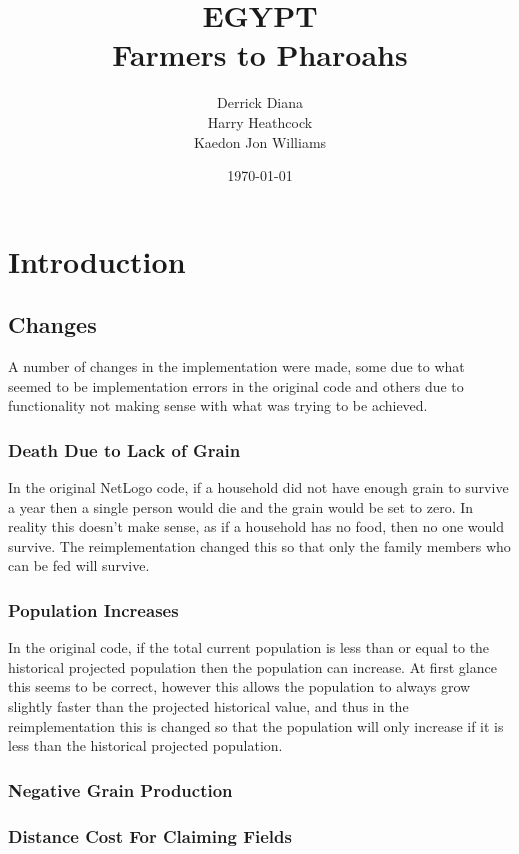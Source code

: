 \documentclass[12pt]{article}
\title{EGYPT\\Farmers to Pharoahs}
\author{Derrick Diana\\Harry Heathcock\\Kaedon Jon Williams}
\date{\today}
\begin{document}
	\maketitle
	\begin{abstract}
			
	\end{abstract}
	
	\section{Introduction}
		\subsection{Changes}
			A number of changes in the implementation were made, some due to what seemed to be implementation errors in the original code and others due to functionality not making sense with what was trying to be achieved.
			\subsubsection{Death Due to Lack of Grain}
				In the original NetLogo code, if a household did not have enough grain to survive a year then a single person would die and the grain would be set to zero. In reality this doesn't make sense, as if a household has no food, then no one would survive. The reimplementation changed this so that only the family members who can be fed will survive.\\
			\subsubsection{Population Increases}
				In the original code, if the total current population is less than or equal to the historical projected population then the population can increase. At first glance this seems to be correct, however this allows the population to always grow slightly faster than the projected historical value, and thus in the reimplementation this is changed so that the population will only increase if it is less than the historical projected population.
			\subsubsection{Negative Grain Production}

			\subsubsection{Distance Cost For Claiming Fields}
\end{document}
